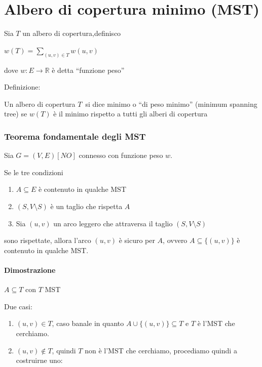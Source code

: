 \chapter{Albero di copertura minimo (MST)}

{Sia $T$ un albero di copertura,definisco}

$w(T) = \sum_{(u,v)\in T}{w(u,v)}$

{dove $w:E\rightarrow \mathbb{R}$ è detta ``funzione peso''}

{Definizione:}

{Un albero di copertura }$T${~si dice minimo o ``di peso minimo'' (minimum spanning tree) se $w(T)$ è il minimo rispetto a tutti gli alberi di copertura}

\subsection{Teorema fondamentale degli MST}

{Sia $G=(V,E) [NO]$ connesso con funzione peso $w$.}

{Se le tre condizioni}

\begin{enumerate}
\tightlist
\item
  {$A \subseteq E$ è contenuto in qualche MST}
\item
  {$(S,V \setminus S)$ è un taglio che rispetta $A$}
\item
  {Sia $(u,v)$ un arco leggero che attraversa il taglio $(S,V \setminus S)$}
\end{enumerate}

{sono rispettate, allora l'arco $(u,v)$ è sicuro per $A$, ovvero $A \subseteq \{(u,v)\}$ è contenuto in qualche MST.}

\subsubsection{Dimostrazione}

{$A \subseteq T$ con $T$ MST}

{Due casi:}

\begin{enumerate}
\tightlist
\item
  {$(u,v) \in T$, caso banale in quanto $A \cup \{(u,v)\} \subseteq T$  e $T$ è l'MST che cerchiamo.}
\item
  {$(u,v) \notin T$, quindi $T$ non è l'MST che cerchiamo, procediamo quindi a costruirne uno:}
\end{enumerate}

